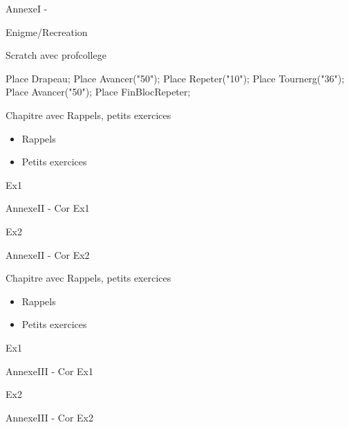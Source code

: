 \documentclass[nocrop]{sesamanuel}
\begin{document}
\recreation
  \begin{enigme}
    AnnexeI -
    
    Enigme/Recreation

    Scratch avec profcollege

      \begin{Scratch}
        Place Drapeau;
        Place Avancer("50");
        Place Repeter("10");
        Place Tournerg("36");
        Place Avancer("50");
        Place FinBlocRepeter;
        \end{Scratch}

    \end{enigme}

\begin{prerequis}[Prérequis - G1]
  Chapitre avec Rappels, petits exercices  
  \begin{itemize}
  \item Rappels
  \item Petits exercices
  \end{itemize}
\end{prerequis}

\begin{autoeval}  
    \begin{exercice}
      Ex1
    \end{exercice}
    \begin{corrige}
      AnnexeII -
      Cor Ex1
    \end{corrige}
    \begin{exercice}
      Ex2
    \end{exercice}
    \begin{corrige}
      AnnexeII -
      Cor Ex2
    \end{corrige}
\end{autoeval}


\begin{prerequis}[Prérequis - G1]
  Chapitre avec Rappels, petits exercices  
  \begin{itemize}
  \item Rappels
  \item Petits exercices
  \end{itemize}
\end{prerequis}

\begin{autoeval}  
    \begin{exercice}
      Ex1
    \end{exercice}
    \begin{corrige}
      AnnexeIII -
      Cor Ex1
    \end{corrige}
    \begin{exercice}
      Ex2
    \end{exercice}
    \begin{corrige}
      AnnexeIII -
      Cor Ex2
    \end{corrige}
\end{autoeval}
\end{document}
